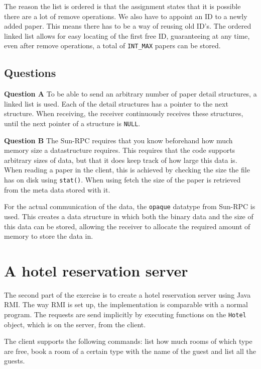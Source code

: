 \documentclass[a4paper]{article}
\begin{document}
The reason the list is ordered is that the assignment states that it is possible there are 
a lot of remove operations. We also have to appoint an ID to a newly added paper. This 
means there has to be a way of reusing old ID's. The ordered linked list allows for easy 
locating of the first free ID, guaranteeing at any time, even after remove operations, a 
total of \texttt{INT\_MAX} papers can be stored.

\subsection{Questions}

\textbf{Question A} To be able to send an arbitrary number of paper detail structures, a
linked list is used. Each of the detail structures has a pointer to the next structure. 
When receiving, the receiver continuously receives these structures, until the next 
pointer of a structure is \texttt{NULL}.

\textbf{Question B} The Sun-RPC requires that you know beforehand how much memory size a
datastructure requires. This requires that the code supports arbitrary sizes of data, but
that it does keep track of how large this data is. When reading a paper in the client, 
this is achieved by checking the size the file has on disk using \texttt{stat()}. When 
using fetch the size of the paper is retrieved from the meta data stored with it.

For the actual communication of the data, the \texttt{opaque} datatype from Sun-RPC is 
used. This creates a data structure in which both the binary data and the size of this 
data can be stored, allowing the receiver to allocate the required amount of memory to
store the data in.

\section{A hotel reservation server}

The second part of the exercise is to create a hotel reservation server using Java RMI.
The way RMI is set up, the implementation is comparable with a normal program. The 
requests are send implicitly by executing functions on the \texttt{Hotel} object, which
is on the server, from the client.

The client supports the following commands: list how much rooms of which type are free, 
book a room of a certain type with the name of the guest and list all the guests.
\end{document}
